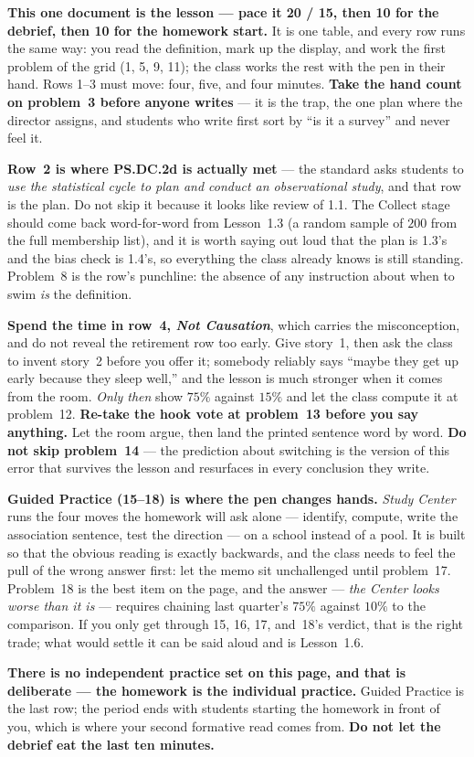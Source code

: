 \documentclass[10pt]{article}
\begin{document}
\begin{teachernote}
\textbf{This one document is the lesson --- pace it 20 / 15, then 10 for the debrief, then 10
for the homework start.} It is one table, and every row runs the same way: you read the
definition, mark up the display, and work the first problem of the grid (1, 5, 9, 11); the
class works the rest with the pen in their hand. Rows 1--3 must move: four, five, and four
minutes. \textbf{Take the hand count on problem~3 before anyone writes} --- it is the trap, the
one plan where the director assigns, and students who write first sort by ``is it a survey''
and never feel it.

\textbf{Row~2 is where PS.DC.2d is actually met} --- the standard asks students to \emph{use the
statistical cycle to plan and conduct an observational study}, and that row is the plan. Do not
skip it because it looks like review of 1.1. The Collect stage should come back word-for-word
from Lesson~1.3 (a random sample of $200$ from the full membership list), and it is worth
saying out loud that the plan is 1.3's and the bias check is 1.4's, so everything the class
already knows is still standing. Problem~8 is the row's punchline: the absence of any
instruction about when to swim \emph{is} the definition.

\textbf{Spend the time in row~4, \emph{Not Causation}}, which carries the misconception, and do
not reveal the retirement row too early. Give story~1, then ask the class to invent story~2
before you offer it; somebody reliably says ``maybe they get up early because they sleep
well,'' and the lesson is much stronger when it comes from the room. \emph{Only then} show
$75\%$ against $15\%$ and let the class compute it at problem~12. \textbf{Re-take the hook vote
at problem~13 before you say anything.} Let the room argue, then land the printed sentence word
by word. \textbf{Do not skip problem~14} --- the prediction about switching is the version of
this error that survives the lesson and resurfaces in every conclusion they write.

\textbf{Guided Practice (15--18) is where the pen changes hands.} \emph{Study Center} runs the
four moves the homework will ask alone --- identify, compute, write the association sentence,
test the direction --- on a school instead of a pool. It is built so that the obvious reading
is exactly backwards, and the class needs to feel the pull of the wrong answer first: let the
memo sit unchallenged until problem~17. Problem~18 is the best item on the page, and the answer
--- \emph{the Center looks worse than it is} --- requires chaining last quarter's $75\%$ against
$10\%$ to the comparison. If you only get through 15, 16, 17, and~18's verdict, that is the
right trade; what would settle it can be said aloud and is Lesson~1.6.

\textbf{There is no independent practice set on this page, and that is deliberate --- the
homework is the individual practice.} Guided Practice is the last row; the period ends with
students starting the homework in front of you, which is where your second formative read comes
from. \textbf{Do not let the debrief eat the last ten minutes.}
\end{teachernote}
\end{document}
